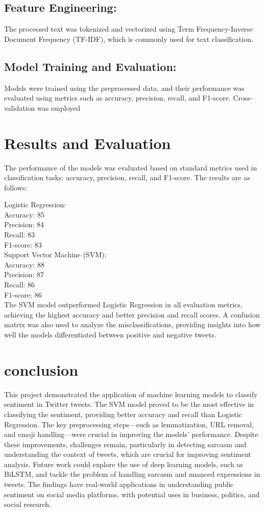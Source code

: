 \documentclass[conference]{IEEEtran}
\begin{document}
    \subsection{Feature Engineering:}
    The processed text was tokenized and vectorized using Term Frequency-Inverse Document Frequency (TF-IDF), which is commonly used for text classification.

    \subsection{Model Training and Evaluation:}
    Models were trained using the preprocessed data, and their performance was evaluated using metrics such as accuracy, precision, recall, and F1-score. Cross-validation was employed
\section{Results and Evaluation}
The performance of the models was evaluated based on standard metrics used in classification tasks: accuracy, precision, recall, and F1-score. 
The results are as follows:

    Logistic Regression:
\\
        Accuracy: 85%
\\
        Precision: 84%
\\
        Recall: 83%
\\
        F1-score: 83%
\\
    Support Vector Machine (SVM):
\\
        Accuracy: 88%
\\
        Precision: 87%
\\
        Recall: 86%
\\
        F1-score: 86%
\\
The SVM model outperformed Logistic Regression in all evaluation metrics, achieving the highest accuracy and better precision and recall scores. 
A confusion matrix was also used to analyze the misclassifications, providing insights into how well the models differentiated between positive
 and negative tweets.
\section{conclusion}
This project demonstrated the application of machine learning models to classify sentiment in Twitter tweets. The SVM model proved to be the 
most effective in classifying the sentiment, providing better accuracy and recall than Logistic Regression. The key preprocessing steps—such as 
lemmatization, URL removal, and emoji handling—were crucial in improving the models' performance. Despite these improvements, challenges remain, 
particularly in detecting sarcasm and understanding the context of tweets, which are crucial for improving sentiment analysis. Future work could 
explore the use of deep learning models, such as BiLSTM, and tackle the problem of handling sarcasm and nuanced expressions in tweets. The findings
 have real-world applications in understanding public sentiment on social media platforms, with potential uses in business, politics, and social 
 research.
\end{document}
